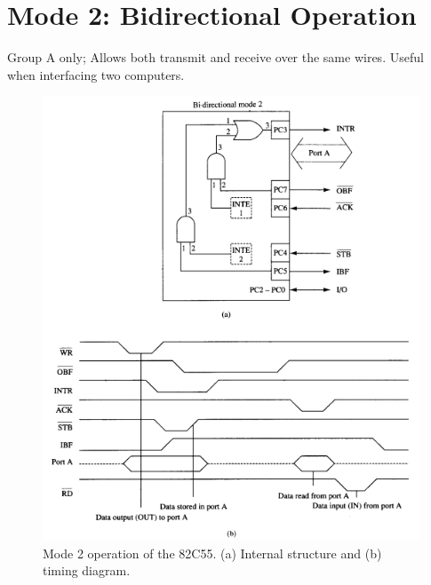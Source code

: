 \section{Mode 2: Bidirectional Operation}
Group A only; Allows both transmit and receive over the same wires. Useful when interfacing two computers.
\begin{figure}[h!]
  \centering
  \includegraphics[width = 1\textwidth]{./figures/Bi_Directional.png}
  \caption{Mode 2 operation of the 82C55. (a) Internal structure and (b) timing diagram.}
\end{figure}
